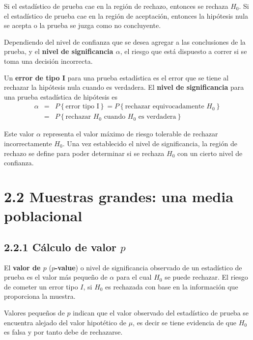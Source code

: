 Si el estadístico de prueba cae en la región de rechazo, entonces se rechaza $H_{0}$. Si el estadístico de prueba cae en la región de aceptación, entonces la hipótesis nula se acepta o la prueba se juzga como no concluyente.\medskip

Dependiendo del nivel de confianza que se desea agregar a las conclusiones de la prueba, y el \textbf{nivel de significancia $\alpha$}, el riesgo que está dispuesto a correr si se toma una decisión incorrecta.

\begin{Def}
Un \textbf{error de tipo I} para una prueba estadística es el error que se tiene al rechazar la hipótesis nula cuando es verdadera. El \textbf{nivel de significancia} para una prueba estadística de hipótesis es
\begin{eqnarray*}
\alpha &=& P\left\{\textrm{error tipo I}\right\} = P\left\{\textrm{rechazar equivocadamente } H_{0}\right\} \\
&=& P\left\{\textrm{rechazar } H_{0} \textrm{ cuando } H_{0} \textrm{ es verdadera}\right\}
\end{eqnarray*}
\end{Def}
Este valor $\alpha$ representa el valor máximo de riesgo tolerable de rechazar incorrectamente $H_{0}$. Una vez establecido el nivel de significancia, la región de rechazo se define para poder determinar si se rechaza $H_{0}$ con un cierto nivel de confianza.


\section{2.2 Muestras grandes: una media poblacional}
\subsection{2.2.1 Cálculo de valor $p$}


\begin{Def}
El \textbf{valor de $p$} (\textbf{$p$-value}) o nivel de significancia observado de un estadístico de prueba es el valor más pequeño de $\alpha$ para el cual $H_{0}$ se puede rechazar. El riesgo de cometer un error tipo $I$, si $H_{0}$ es rechazada con base en la información que proporciona la muestra.
\end{Def}

\begin{Note}
Valores pequeños de $p$ indican que el valor observado del estadístico de prueba se encuentra alejado del valor hipotético de $\mu$, es decir se tiene evidencia de que $H_{0}$ es falsa y por tanto debe de rechazarse.
\end{Note}

